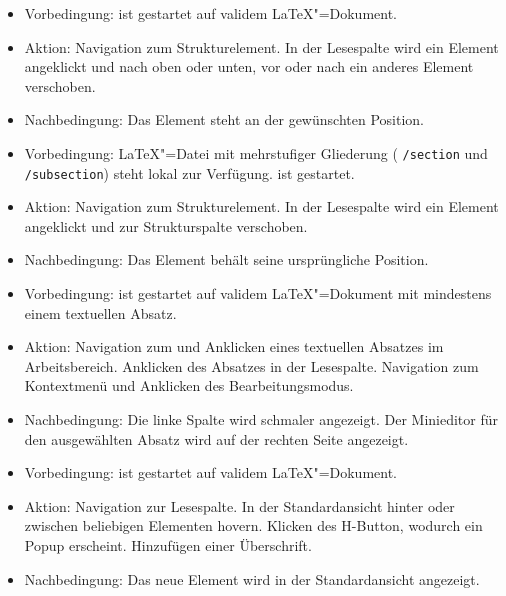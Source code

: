 \begin{itemize}
\item Vorbedingung: \texla{} ist gestartet auf validem \LaTeX"=Dokument.
  \item Aktion: Navigation zum Strukturelement.
  In der Lesespalte wird ein Element angeklickt und nach oben oder unten, vor oder nach ein anderes Element
  verschoben.
  \item Nachbedingung: Das Element steht an der gewünschten Position.

\end{itemize}

\begin{itemize}
\item Vorbedingung: \LaTeX"=Datei mit mehrstufiger Gliederung (\zB{} \verb|/section| und \verb|/subsection|) steht
  lokal zur Verfügung.
  \texla{} ist gestartet.
  \item Aktion: Navigation zum Strukturelement.
  In der Lesespalte wird ein Element angeklickt und zur Strukturspalte verschoben.
  \item Nachbedingung: Das Element behält seine ursprüngliche Position.

\end{itemize}

\begin{itemize}
\item Vorbedingung: \texla{} ist gestartet auf validem \LaTeX"=Dokument mit mindestens einem textuellen Absatz.
  \item Aktion: Navigation zum und Anklicken eines textuellen Absatzes im Arbeitsbereich.
  Anklicken des Absatzes in der Lesespalte.
  Navigation zum Kontextmenü und Anklicken des Bearbeitungsmodus.
  \item Nachbedingung: Die linke Spalte wird schmaler angezeigt.
  Der Minieditor für den ausgewählten Absatz wird auf der rechten Seite angezeigt.

\end{itemize}
\clearpage


\begin{itemize}
\item Vorbedingung: \texla{} ist gestartet auf validem \LaTeX"=Dokument.
  \item Aktion: Navigation zur Lesespalte.
  In der Standardansicht hinter oder zwischen beliebigen Elementen hovern.
  Klicken des H-Button, wodurch ein Popup erscheint.
  Hinzufügen einer Überschrift.
  \item Nachbedingung: Das neue Element wird in der Standardansicht angezeigt.

\end{itemize}

